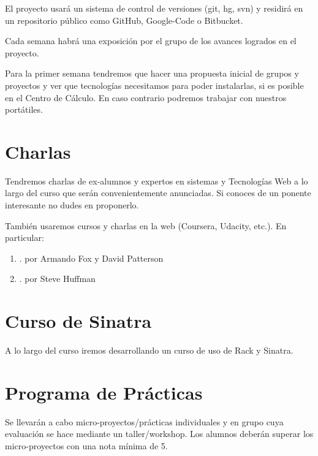 \documentclass[11pt,a4paper]{article}
\begin{document}
El proyecto usará un sistema de control de versiones (git, hg, svn) y 
residirá en un repositorio público como GitHub, Google-Code o Bitbucket.

Cada semana habrá una exposición por el grupo de los avances logrados en el proyecto.

Para la primer semana tendremos que hacer una propuesta inicial de grupos y proyectos y ver que tecnologías necesitamos para poder instalarlas,
si es posible en el Centro de Cálculo. En caso contrario podremos trabajar con nuestros portátiles.

\section{Charlas}
Tendremos charlas de ex-alumnos y expertos en sistemas y Tecnologías Web a lo largo del curso que serán convenientemente anunciadas.
Si conoces de un ponente interesante no dudes en proponerlo.


También usaremos cursos y charlas en la web (Coursera, Udacity, etc.). En particular:
\begin{enumerate}
\item {}.  por Armando Fox y David Patterson
\item {}.  por Steve Huffman
\end{enumerate}

\section{Curso de Sinatra}
A lo largo del curso iremos desarrollando un curso de uso de Rack y Sinatra.

\section{Programa de Pr\'acticas}

Se llevarán a cabo micro-proyectos/prácticas individuales y en grupo cuya evaluación se hace mediante un 
taller/workshop. Los alumnos deberán superar los micro-proyectos con una nota mínima de 5. 
\end{document}
